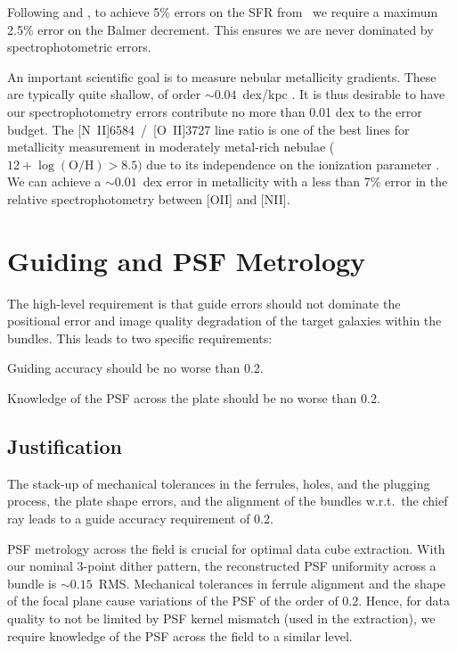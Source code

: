 \documentclass[11pt,a4paper,twoside,onecolumn,openany,final,oldfontcommands]{memoir}
\begin{document}
Following \citet{kennicutt1998} and \citet{calzetti01}, to achieve 5\% errors on the SFR from \Halpha\ we require a maximum 2.5\% error on the Balmer decrement. This ensures we are never dominated by spectrophotometric errors.

An important scientific goal is to measure nebular metallicity gradients. These are typically quite shallow, of order $\sim0.04$~dex/kpc \citep{vanzee1996}. It is thus desirable to have our spectrophotometry errors contribute no more than 0.01 dex to the error budget. The [N~II]6584~/~[O~II]3727 line ratio is one of the best lines for metallicity measurement in moderately metal-rich nebulae ($12 + \log(\mathrm{O/H}) > 8.5)$ due to its independence on the ionization parameter \citep{kewley02}. We can achieve a $\sim0.01$~dex error in metallicity with a less than 7\% error in the relative spectrophotometry between [OII] and [NII].

\section{Guiding and PSF Metrology}
\label{sec:guiding}

The high-level requirement is that guide errors should not dominate the positional error and image quality degradation of the target galaxies within the bundles. This leads to two specific requirements:

\begin{requirement}

\reqitem Guiding accuracy should be no worse than 0.2\arcsec.
    
\reqitem Knowledge of the PSF across the plate should be no worse than 0.2\arcsec.
    
\end{requirement}

\subsection{Justification}

The stack-up of mechanical tolerances in the ferrules, holes, and the plugging process, the plate shape errors, and the alignment of the bundles w.r.t.\ the chief ray leads to a guide accuracy requirement of 0.2\arcsec.

PSF metrology across the field is crucial for optimal data cube extraction. With our nominal 3-point dither pattern, the reconstructed PSF uniformity across a bundle is $\sim 0.15$\arcsec\ RMS. Mechanical tolerances in ferrule alignment and  the shape of the focal plane cause variations of the PSF of the order of 0.2\arcsec. Hence, for data quality to not be limited by PSF kernel mismatch (used in the extraction),  we require knowledge of the PSF across the field to a similar level.
\end{document}
